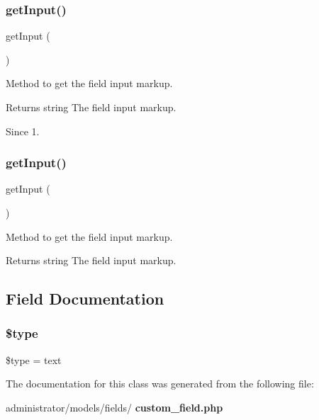 \subsubsection{get\+Input()\hspace{0.1cm}{\footnotesize\ttfamily [1/2]}}
{\footnotesize\ttfamily get\+Input (\begin{DoxyParamCaption}{ }\end{DoxyParamCaption})\hspace{0.3cm}{\ttfamily [protected]}}

Method to get the field input markup.

\begin{DoxyReturn}{Returns}
string The field input markup.
\end{DoxyReturn}
\begin{DoxySince}{Since}
1. 
\end{DoxySince}
\mbox{\label{class_j_form_field_custom_field_a4380f30ae9202fa49ebd2439572f9cdb}} 
\subsubsection{get\+Input()\hspace{0.1cm}{\footnotesize\ttfamily [2/2]}}
{\footnotesize\ttfamily get\+Input (\begin{DoxyParamCaption}{ }\end{DoxyParamCaption})\hspace{0.3cm}{\ttfamily [protected]}}

Method to get the field input markup.

\begin{DoxyReturn}{Returns}
string The field input markup. 
\end{DoxyReturn}


\subsection{Field Documentation}
\mbox{\label{class_j_form_field_custom_field_a9a4a6fba2208984cabb3afacadf33919}} 
\subsubsection{\$type}
{\footnotesize\ttfamily \$type = \textquotesingle{}text\textquotesingle{}\hspace{0.3cm}{\ttfamily [protected]}}



The documentation for this class was generated from the following file\+:\begin{DoxyCompactItemize}
\item 
administrator/models/fields/\textbf{ custom\+\_\+field.\+php}\end{DoxyCompactItemize}
